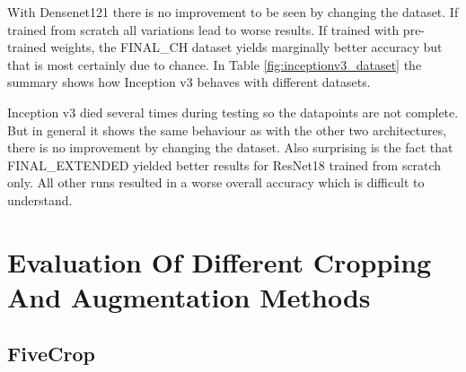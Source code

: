 With Densenet121 there is no improvement to be seen by changing the dataset. If trained from scratch all variations lead to worse results. If trained with pre-trained weights, the FINAL\_CH dataset yields marginally better accuracy but that is most certainly due to chance. In Table \ref{fig:inceptionv3_dataset} the summary shows how Inception v3 behaves with different datasets.

\begin{table}[h] \centering
{}
\caption{Dataset variations with Inception v3. The first group shows how the datasets performed when trained from scratch whereas the second group shows how the datasets performed with pre-training. FINAL\_C\_B died for the non-pre-trained twice. Only one datapoint used.}
\label{tbl:inceptionv3_dataset}
\end{table}

Inception v3 died several times during testing so the datapoints are not complete. But in general it shows the same behaviour as with the other two architectures, there is no improvement by changing the dataset. Also surprising is the fact that FINAL\_EXTENDED yielded better results for ResNet18 trained from scratch only. All other runs resulted in a worse overall accuracy which is difficult to understand.

\section{Evaluation Of Different Cropping And Augmentation Methods}

\subsection{FiveCrop}

